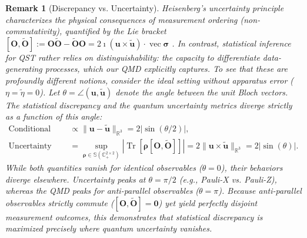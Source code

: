 \documentclass[noinfoline]{imsart}\setcounter{tocdepth}{2}
\renewcommand{\b}[1]{\mathbb{#1}} %
\newcommand{\m}[1]{\mathbf{#1}} %
\newcommand{\mb}[1]{\boldsymbol{#1}} %
\newcommand{\tr}[1]{\operatorname{Tr}\left[#1\right]}
\renewcommand{\vec}{\operatorname{vec}}
\theoremstyle{plain}
\newtheorem{remark}[theorem]{Remark}
\begin{document}
\begin{remark}[Discrepancy vs. Uncertainty]
Heisenberg's uncertainty principle characterizes the physical consequences of measurement ordering (non-commutativity), quantified by the Lie bracket $[\m{O}, \tilde{\m{O}}] := \m{O} \tilde{\m{O}} - \tilde{\m{O}} \m{O} = 2 \imath (\m{u} \times \tilde{\m{u}}) \cdot \vec{\mb{\sigma}}$ \cite{talagrand2022quantum}. In contrast, statistical inference for QST rather relies on distinguishability: the capacity to differentiate data-generating processes, which our QMD explicitly captures. To see that these are profoundly different notions, consider the ideal setting without apparatus error ($\eta = \tilde{\eta} = 0$). Let $\theta = \angle(\m{u}, \tilde{\m{u}})$ denote the angle between the unit Bloch vectors. The statistical discrepancy and the quantum uncertainty metrics diverge strictly as a function of this angle:
\begin{align*}
    \text{Conditional QMD Bound} &\propto \|\m{u} - \tilde{\m{u}}\|_{\b{R}^{3}} = 2 |\sin(\theta/2)|, \\
    \text{Uncertainty Bound} &= \sup_{\mb{\rho} \in \b{S}(\b{C}_{+}^{2 \times 2})} \left|\tr{\mb{\rho} [\m{O}, \tilde{\m{O}}]} \right| = 2 \|\m{u} \times \tilde{\m{u}} \|_{\b{R}^{3}} = 2 |\sin(\theta)|.
\end{align*}
While both quantities vanish for identical observables ($\theta=0$), their behaviors diverge elsewhere. Uncertainty peaks at $\theta = \pi/2$ (e.g., Pauli-X vs. Pauli-Z), whereas the QMD peaks for anti-parallel observables ($\theta = \pi$). Because anti-parallel observables strictly commute ($[\m{O}, \tilde{\m{O}}] = \m{0}$) yet yield perfectly disjoint measurement outcomes, this demonstrates that statistical discrepancy is maximized precisely where quantum uncertainty vanishes.
\end{remark}
\end{document}
